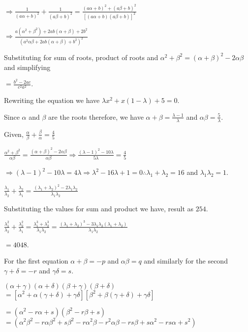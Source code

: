   $\Rightarrow \frac{1}{(a\alpha + b)^2} + \frac{1}{(a\beta + b)^2} = \frac{(a\alpha + b)^2 + (a\beta +
    b)^2}{[(a\alpha + b)(a\beta + b)]^2}$

  $\Rightarrow \frac{a(\alpha^2 + \beta^2) + 2ab(\alpha + \beta) + 2b^2}{(a^2\alpha\beta + 2ab(\alpha +
    \beta) + b^2)^2}$

  Substituting for sum of roots, product of roots and $\alpha^2 + \beta^2 = (\alpha + \beta)^2 -
  2\alpha\beta$ and simplifying

  $= \frac{b^2 - 2ac}{c^2a^2}$.
\item Rewriting the equation we have $\lambda x^2 + x(1 - \lambda) + 5 = 0$.

  Since $\alpha$ and $\beta$ are the roots therefore, we have $\alpha + \beta = \frac{\lambda - 1}{\lambda}$
  and $\alpha\beta = \frac{5}{\lambda}$.

  Given, $\frac{\alpha}{\beta} + \frac{\beta}{\alpha} = \frac{4}{5}$

  $\frac{\alpha^2 + \beta^2}{\alpha\beta} = \frac{(\alpha + \beta)^2 - 2\alpha\beta}{\alpha\beta}\Rightarrow
  \frac{(\lambda - 1)^2 - 10\lambda}{5\lambda} = \frac{4}{5}$

  $\Rightarrow (\lambda - 1)^2 - 10\lambda = 4\lambda \Rightarrow \lambda^2 - 16\lambda + 1 = 0\therefore
  \lambda_1 + \lambda_2 = 16$ and $\lambda_1\lambda_2 = 1$.
  \startitemize[i]
  \item $\frac{\lambda_1}{\lambda_2} + \frac{\lambda_2}{\lambda_1} = \frac{(\lambda_1 + \lambda_2)^2 -
    2\lambda_1\lambda_2}{\lambda_1\lambda_2}$

    Substituting the values for sum and product we have, result as $254$.
  \item $\frac{\lambda_1^2}{\lambda_2} + \frac{\lambda_2^2}{\lambda_1} = \frac{\lambda_1^3 +
    \lambda_2^3}{\lambda_1\lambda_2} = \frac{(\lambda_1 + \lambda_2)^3 - 3\lambda_1\lambda_2(\lambda_1 +
    \lambda_2)}{\lambda_1\lambda_2}$

    $= 4048$.
  \stopitemize
\item For the first equation $\alpha + \beta = -p$ and $\alpha\beta = q$ and similarly for the second
  $\gamma + \delta = -r$ and $\gamma\delta = s$.
  \startitemize[i]
  \item $(\alpha + \gamma)(\alpha + \delta)(\beta + \gamma)(\beta + \delta)$
    $= [\alpha^2 + \alpha(\gamma + \delta) + \gamma\delta][\beta^2 + \beta(\gamma + \delta) + \gamma\delta]$

    $= (\alpha^2 - r\alpha + s)(\beta^2 - r\beta + s)$
    $= (\alpha^2\beta^2 - r\alpha\beta^2 + s\beta^2 - r\alpha^2\beta - r^2\alpha\beta - rs\beta + s\alpha^2 - rs\alpha +
    s^2)$

